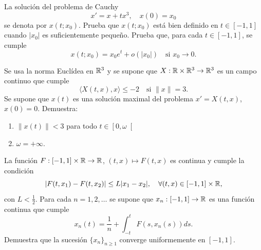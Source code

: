 \documentclass[12pt]{article}
\begin{document}
    \begin{ejercicio}
        La solución del problema de Cauchy
        \[
            x' = x + tx^3, \quad x(0) = x_0
        \]
        se denota por $x(t; x_0)$. Prueba que $x(t; x_0)$ está bien definido en $t \in \left[-1, 1\right]$ cuando $|x_0|$ es suficientemente pequeño. Prueba que, para cada $t \in \left[-1, 1\right]$, se cumple
        \[
            x(t; x_0) = x_0 e^t + o(|x_0|) \quad \text{si } x_0 \to 0.
        \]
    \end{ejercicio}

    \begin{ejercicio}
        Se usa la norma Euclídea en $\mathbb{R}^3$ y se supone que $X : \mathbb{R} \times \mathbb{R}^3 \to \mathbb{R}^3$ es un campo continuo que cumple
        \[
            \langle X(t,x), x \rangle \leq -2 \quad \text{si } \|x\| = 3.
        \]
        Se supone que $x(t)$ es una solución maximal del problema $x' = X(t,x)$, $x(0) = 0$. Demuestra:
        \begin{enumerate}[label=\alph*)]
            \item $\|x(t)\| < 3$ para todo $t \in \left[0, \omega\right[$
            \item $\omega = +\infty$.
        \end{enumerate}
    \end{ejercicio}

    \begin{ejercicio}
        La función $F : \left[-1, 1\right] \times \mathbb{R} \to \mathbb{R}$, $(t,x) \mapsto F(t,x)$ es continua y cumple la condición
        \[
            |F(t, x_1) - F(t, x_2)| \leq L |x_1 - x_2|, \quad \forall (t,x) \in \left[-1, 1\right] \times \mathbb{R},
        \]
        con $L < \frac{1}{2}$. Para cada $n = 1, 2, \dots$ se supone que $x_n : \left[-1, 1\right] \to \mathbb{R}$ es una función continua que cumple
        \[
            x_n(t) = \frac{1}{n} + \int_{-t}^t F(s, x_n(s))ds.
        \]
        Demuestra que la sucesión $\{x_n\}_{n \geq 1}$ converge uniformemente en $\left[-1, 1\right]$.
    \end{ejercicio}

    \newpage
    \setcounter{ejercicio}{0} %
\end{document}
